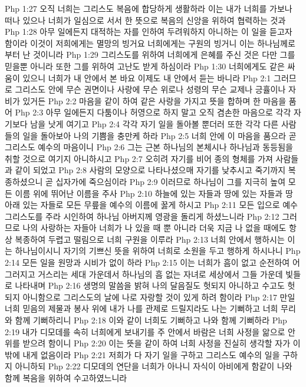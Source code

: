 Php 1:27  오직 너희는 그리스도 복음에 합당하게 생활하라 이는 내가 너희를 가보나 떠나 있으나 너희가 일심으로 서서 한 뜻으로 복음의 신앙을 위하여 협력하는 것과
Php 1:28  아무 일에든지 대적하는 자를 인하여 두려워하지 아니하는 이 일을 듣고자 함이라 이것이 저희에게는 멸망의 빙거요 너희에게는 구원의 빙거니 이는 하나님께로부터 난 것이니라
Php 1:29  그리스도를 위하여 너희에게 은혜를 주신 것은 다만 그를 믿을뿐 아니라 또한 그를 위하여 고난도 받게 하심이라
Php 1:30  너희에게도 같은 싸움이 있으니 너희가 내 안에서 본 바요 이제도 내 안에서 듣는 바니라
Php 2:1  그러므로 그리스도 안에 무슨 권면이나 사랑에 무슨 위로나 성령의 무슨 교제나 긍휼이나 자비가 있거든
Php 2:2  마음을 같이 하여 같은 사랑을 가지고 뜻을 합하며 한 마음을 품어
Php 2:3  아무 일에든지 다툼이나 허영으로 하지 말고 오직 겸손한 마음으로 각각 자기보다 남을 낫게 여기고
Php 2:4  각각 자기 일을 돌아볼 뿐더러 또한 각각 다른 사람들의 일을 돌아보아 나의 기쁨을 충만케 하라
Php 2:5  너희 안에 이 마음을 품으라 곧 그리스도 예수의 마음이니
Php 2:6  그는 근본 하나님의 본체시나 하나님과 동등됨을 취할 것으로 여기지 아니하시고
Php 2:7  오히려 자기를 비어 종의 형체를 가져 사람들과 같이 되었고
Php 2:8  사람의 모양으로 나타나셨으매 자기를 낮추시고 죽기까지 복종하셨으니 곧 십자가에 죽으심이라
Php 2:9  이러므로 하나님이 그를 지극히 높여 모든 이름 위에 뛰어난 이름을 주사
Php 2:10  하늘에 있는 자들과 땅에 있는 자들과 땅 아래 있는 자들로 모든 무릎을 예수의 이름에 꿇게 하시고
Php 2:11  모든 입으로 예수 그리스도를 주라 시인하여 하나님 아버지께 영광을 돌리게 하셨느니라
Php 2:12  그러므로 나의 사랑하는 자들아 너희가 나 있을 때 뿐 아니라 더욱 지금 나 없을 때에도 항상 복종하여 두렵고 떨림으로 너희 구원을 이루라
Php 2:13  너희 안에서 행하시는 이는 하나님이시니 자기의 기쁘신 뜻을 위하여 너희로 소원을 두고 행하게 하시나니
Php 2:14  모든 일을 원망과 시비가 없이 하라
Php 2:15  이는 너희가 흠이 없고 순전하여 어그러지고 거스리는 세대 가운데서 하나님의 흠 없는 자녀로 세상에서 그들 가운데 빛들로 나타내며
Php 2:16  생명의 말씀을 밝혀 나의 달음질도 헛되지 아니하고 수고도 헛되지 아니함으로 그리스도의 날에 나로 자랑할 것이 있게 하려 함이라
Php 2:17  만일 너희 믿음의 제물과 봉사 위에 내가 나를 관제로 드릴지라도 나는 기뻐하고 너희 무리와 함께 기뻐하리니
Php 2:18  이와 같이 너희도 기뻐하고 나와 함께 기뻐하라
Php 2:19  내가 디모데를 속히 너희에게 보내기를 주 안에서 바람은 너희 사정을 앎으로 안위를 받으려 함이니
Php 2:20  이는 뜻을 같이 하여 너희 사정을 진실히 생각할 자가 이 밖에 내게 없음이라
Php 2:21  저희가 다 자기 일을 구하고 그리스도 예수의 일을 구하지 아니하되
Php 2:22  디모데의 연단을 너희가 아나니 자식이 아비에게 함같이 나와 함께 복음을 위하여 수고하였느니라
